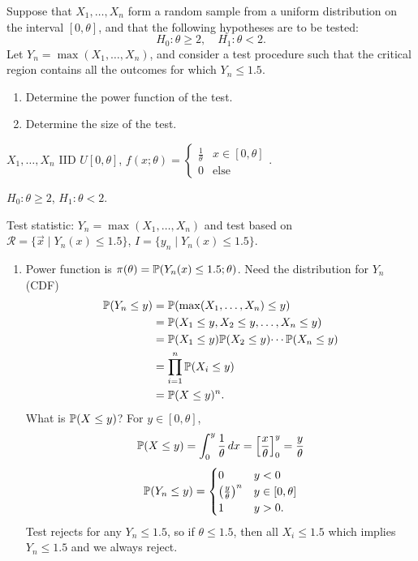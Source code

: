\documentclass[10pt, a4paper]{article}
\begin{document}
\begin{problem}
    Suppose that $X_1, \dotsc, X_n$ form a random sample from a uniform distribution on the interval $[0, \theta]$,
    and that the following hypotheses are to be tested:
    \[
    H_0 : \theta \geq 2,\quad H_1 : \theta < 2.
    \]
    Let $Y_n = \max(X_1, \dotsc, X_n)$,
    and consider a test procedure such that the critical region contains all the outcomes for which $Y_n \leq 1.5$.

    \begin{enumerate}[label = (\alph*)]
        \item Determine the power function of the test.

        \item Determine the size of the test.
    \end{enumerate}

    \begin{solution}
        $X_1, \dotsc, X_n$ IID $U[0, \theta]$,
        $f(x; \theta) = \begin{cases}
            \frac{1}{\theta} & x \in [0, \theta] \\
            0 &\text{else}
        \end{cases}$.
        
        $H_0 : \theta \geq 2$,
        $H_1 : \theta < 2$.

        Test statistic:
        $Y_n = \max(X_1, \dotsc, X_n)$ and test based on $\mathcal{R} = \{\vec{x}\mid Y_n(x) \leq 1.5\}$,
        $I = \{y_n \mid Y_n(x) \leq 1.5\}$.
        
        \begin{enumerate}[label = (\alph*)]
            \item
            Power function is $\pi(\theta) = \P(Y_n(x) \leq 1.5; \theta)$.
            Need the distribution for $Y_n$
            (CDF)
            \begin{align*}
                \P(Y_n \leq y) &= \P(\max(X_1, \dotsc, X_n) \leq y) \\
                &= \P(X_1 \leq y, X_2 \leq y, \dotsc, X_n \leq y) \\
                &= \P(X_1 \leq y)\P(X_2 \leq y)\dotsi \P(X_n \leq y) \\
                &= \prod_{i = 1}^{n}\P(X_i \leq y) \\
                &= \P(X \leq y) ^ n.
            \end{align*}
            What is $\P(X \leq y)$?
            For $y \in [0, \theta]$,
            \[
            \P(X \leq y) = \int_{0}^{y}\frac{1}{\theta}\,dx = \left[\frac{x}{\theta}\right]_{0}^{y} = \frac{y}{\theta}
            \]
            \[
            \P(Y_n \leq y) = \begin{cases}
                0 & y < 0 \\
                \left(\frac{y}{\theta}\right) ^ n & y \in [0, \theta] \\
                1 & y > 0.
            \end{cases}
            \]
            Test rejects for any $Y_n \leq 1.5$,
            so if $\theta \leq 1.5$,
            then all $X_i \leq 1.5$ which implies $Y_n \leq 1.5$ and we always reject.


\end{enumerate}
\end{solution}
\end{problem}
\end{document}
